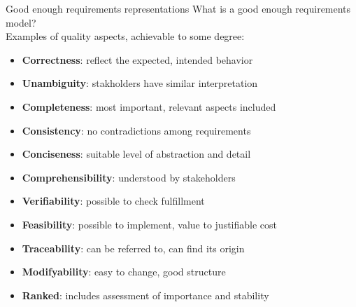 \documentclass{simpleslides}
\begin{document}
\begin{frame}[fragile]{Good enough requirements representations}
What is a good enough requirements model?
\\ \vspace*{0.5em}Examples of quality aspects, achievable to some degree:
\begin{itemize}
\item \textbf{Correctness}: reflect the expected, intended behavior
\item \textbf{Unambiguity}: stakholders have similar interpretation
\item \textbf{Completeness}: most important, relevant aspects included
\item \textbf{Consistency}: no contradictions among requirements
\item \textbf{Conciseness}: suitable level of abstraction and detail 
\item \textbf{Comprehensibility}: understood by stakeholders 
\item \textbf{Verifiability}: possible to check fulfillment 
\item \textbf{Feasibility}: possible to implement, value to justifiable cost 
\item \textbf{Traceability}: can be referred to, can find its origin
\item \textbf{Modifyability}: easy to change, good structure
\item \textbf{Ranked}: includes assessment of importance and stability
\end{itemize}
\end{frame}
\end{document}
